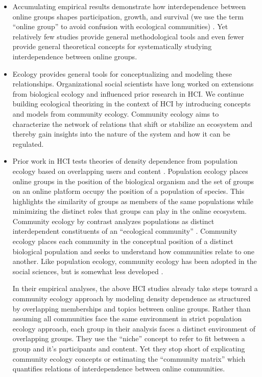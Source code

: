 \documentclass[12pt]{memoir}
\begin{document}
\begin{itemize}
\item Accumulating empirical results demonstrate how interdependence between online groups shapes participation, growth, and survival (we use the term ``online group'' to avoid confusion with ecological communities) \citep[e.g.][]{vincent_examining_2018,chandrasekharan_you_2017,tan_all_2015,tan_tracing_2018}.   Yet relatively few studies provide general methodological tools and even fewer provide general theoretical concepts for systematically studying interdependence between online groups.

\item Ecology provides general tools for conceptualizing and modeling these relationships.  Organizational social scientists have long worked on extensions from biological ecology and influenced prior research in HCI.  We continue building ecological theorizing in the context of HCI by introducing concepts and models from community ecology.  Community ecology aims to characterize the network of relations that shift or stabilize an ecosystem and thereby gain insights into the nature of the system and how it can be regulated.  

\item Prior work in HCI tests theories of density dependence from population ecology based on overlapping users and content \citep{zhu_impact_2014,zhu_selecting_2014,wang_impact_2013}.  Population ecology places online groups in the position of the biological organism and the set of groups on an online platform occupy the position of a population of species.  This highlights the similarity of groups as members of the same populations while minimizing the distinct roles that groups can play in the online ecosystem.   Community ecology by contrast analyzes populations as distinct interdependent constituents of an ``ecological community'' \citep{astley_two_1985-1}.  Community ecology places each community in the conceptual position of a distinct biological population and seeks to understand how communities relate to one another.  Like population ecology, community ecology has been adopted in the social sciences, but is somewhat less developed \citep[e.g.][]{margolin_normative_2012,ruef_emergence_2000,powell_network_2005,mcpherson_testing_1996-1}. 

In their empirical analyses, the above HCI studies already take steps toward a community ecology approach by modeling density dependence as structured by overlapping memberships and topics between online groups.  Rather than assuming all communities face the same environment in strict population ecology approach, each group in their analysis faces a distinct environment of overlapping groups. They use the ``niche'' concept to refer to fit between a group and it's participants and content. Yet they stop short of explicating community ecology concepts or estimating the ``community matrix'' which quantifies relations of interdependence between online communities. 


\end{itemize}
\end{document}
